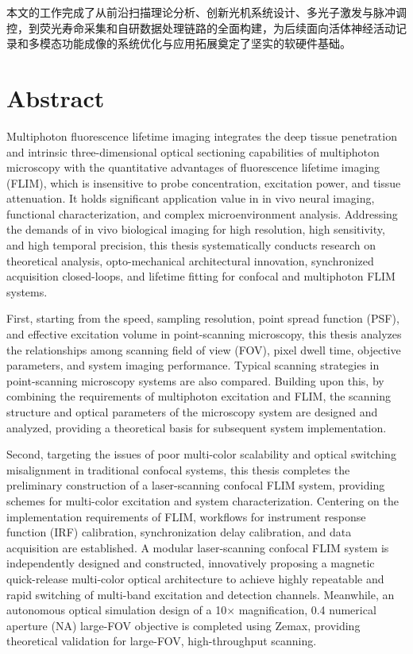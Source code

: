 本文的工作完成了从前沿扫描理论分析、创新光机系统设计、多光子激发与脉冲调控，到荧光寿命采集和自研数据处理链路的全面构建，为后续面向活体神经活动记录和多模态功能成像的系统优化与应用拓展奠定了坚实的软硬件基础。

\intobmk\chapter*{Abstract}%
Multiphoton fluorescence lifetime imaging integrates the deep tissue penetration and intrinsic three-dimensional optical sectioning capabilities of multiphoton microscopy with the quantitative advantages of fluorescence lifetime imaging (FLIM), which is insensitive to probe concentration, excitation power, and tissue attenuation. It holds significant application value in in vivo neural imaging, functional characterization, and complex microenvironment analysis. Addressing the demands of in vivo biological imaging for high resolution, high sensitivity, and high temporal precision, this thesis systematically conducts research on theoretical analysis, opto-mechanical architectural innovation, synchronized acquisition closed-loops, and lifetime fitting for confocal and multiphoton FLIM systems.

First, starting from the speed, sampling resolution, point spread function (PSF), and effective excitation volume in point-scanning microscopy, this thesis analyzes the relationships among scanning field of view (FOV), pixel dwell time, objective parameters, and system imaging performance. Typical scanning strategies in point-scanning microscopy systems are also compared. Building upon this, by combining the requirements of multiphoton excitation and FLIM, the scanning structure and optical parameters of the microscopy system are designed and analyzed, providing a theoretical basis for subsequent system implementation.

Second, targeting the issues of poor multi-color scalability and optical switching misalignment in traditional confocal systems, this thesis completes the preliminary construction of a laser-scanning confocal FLIM system, providing schemes for multi-color excitation and system characterization. Centering on the implementation requirements of FLIM, workflows for instrument response function (IRF) calibration, synchronization delay calibration, and data acquisition are established. A modular laser-scanning confocal FLIM system is independently designed and constructed, innovatively proposing a magnetic quick-release multi-color optical architecture to achieve highly repeatable and rapid switching of multi-band excitation and detection channels. Meanwhile, an autonomous optical simulation design of a 10$\times$ magnification, 0.4 numerical aperture (NA) large-FOV objective is completed using Zemax, providing theoretical validation for large-FOV, high-throughput scanning.

